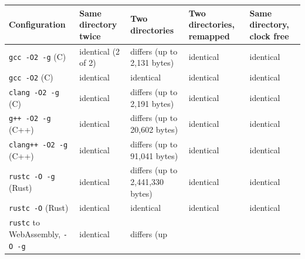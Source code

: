 \documentclass[10pt,letterpaper]{article}
\begin{document}
{\footnotesize\setlength{\tabcolsep}{3.8pt}\renewcommand{\arraystretch}{1.15}
\begin{longtable}[]{@{}
  >{\raggedright\arraybackslash}p{}
  >{\raggedright\arraybackslash}p{}
  >{\raggedright\arraybackslash}p{}
  >{\raggedright\arraybackslash}p{}
  >{\raggedright\arraybackslash}p{}@{}}
\toprule\noalign{}
\begin{minipage}[b]{\linewidth}\raggedright
\textbf{Configuration}
\end{minipage} & \begin{minipage}[b]{\linewidth}\raggedright
\textbf{Same directory twice}
\end{minipage} & \begin{minipage}[b]{\linewidth}\raggedright
\textbf{Two directories}
\end{minipage} & \begin{minipage}[b]{\linewidth}\raggedright
\textbf{Two directories, remapped}
\end{minipage} & \begin{minipage}[b]{\linewidth}\raggedright
\textbf{Same directory, clock free}
\end{minipage} \\
\midrule\noalign{}
\endhead
\bottomrule\noalign{}
\endlastfoot
\texttt{gcc\ -\allowbreak{}O2\ -\allowbreak{}g} (C) & identical (2 of 2) & differs (up to 2,131
bytes) & identical & identical \\
\texttt{gcc\ -O2} (C) & identical & identical & identical & identical \\
\texttt{clang\ -\allowbreak{}O2\ -\allowbreak{}g} (C) & identical & differs (up to 2,191 bytes) &
identical & identical \\
\texttt{g++\ -\allowbreak{}O2\ -\allowbreak{}g} (C++) & identical & differs (up to 20,602 bytes) &
identical & identical \\
\texttt{clang++\ -\allowbreak{}O2\ -\allowbreak{}g} (C++) & identical & differs (up to 91,041
bytes) & identical & identical \\
\texttt{rustc\ -\allowbreak{}O\ -\allowbreak{}g} (Rust) & identical & differs (up to 2,441,330
bytes) & identical & identical \\
\texttt{rustc\ -O} (Rust) & identical & identical & identical &
identical \\
\texttt{rustc} to WebAssembly, \texttt{-O\ -g} & identical & differs (up

\end{longtable}}
\end{document}
